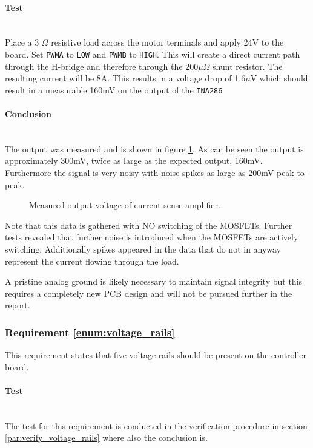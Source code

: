 \paragraph{Test}~\\
Place a 3 $\Omega$ resistive load across the motor terminals and apply 24V to the board.
Set \texttt{PWMA} to \texttt{LOW} and \texttt{PWMB} to \texttt{HIGH}.
This will create a direct current path through the H-bridge and therefore through the 200$\mu\Omega$ shunt resistor.
The resulting current will be 8A.
This results in a voltage drop of 1.6$\mu$V which should result in a measurable 160mV on the output of the \texttt{INA286}

\paragraph{Conclusion}~\\
The output was measured and is shown in figure \ref{fig:controllerboardv2_current_sense}.
As can be seen the output is approximately 300mV, twice as large as the expected output, 160mV.
Furthermore the signal is very noisy with noise spikes as large as 200mV peak-to-peak. 

\begin{figure}[h]
\centering

\caption{Measured output voltage of current sense amplifier.}
\label{fig:controllerboardv2_current_sense}
\end{figure}

Note that this data is gathered with NO switching of the MOSFETs.
Further tests revealed that further noise is introduced when the MOSFETs are actively switching.
Additionally spikes appeared in the data that do not in anyway represent the current flowing through the load.

A pristine analog ground is likely necessary to maintain signal integrity but this requires a completely new PCB design and will not be pursued further in the report. 

\subsubsection{Requirement \ref{enum:voltage_rails}} %
\label{ssub:requirement_enum:voltage_rails}
This requirement states that five voltage rails should be present on the controller board. 

\paragraph{Test}~\\
The test for this requirement is conducted in the verification procedure in section \ref{par:verify_voltage_rails} where also the conclusion is.

